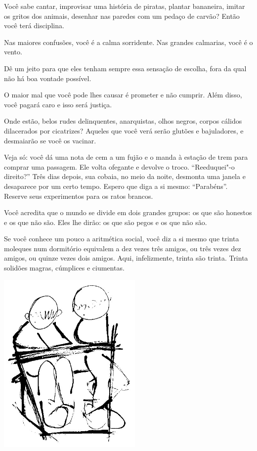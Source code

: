 Você sabe cantar, improvisar uma história de piratas, plantar bananeira,
imitar os gritos dos animais, desenhar nas paredes com um pedaço de
carvão? Então você terá disciplina.

\bigskip
\bigskip

Nas maiores confusões, você é a calma sorridente. Nas grandes calmarias,
você é o vento.

\bigskip
\bigskip

Dê um jeito para que eles tenham sempre essa sensação de escolha, fora
da qual não há boa vontade possível.

\bigskip
\bigskip

O maior mal que você pode lhes causar é prometer e não cumprir. Além
disso, você pagará caro e isso será justiça.

\bigskip
\bigskip

Onde estão, belos rudes delinquentes, anarquistas, olhos negros, corpos
cálidos dilacerados por cicatrizes? Aqueles que você verá serão glutões
e bajuladores, e desmaiarão se você os vacinar.

\bigskip
\bigskip

Veja só: você dá uma nota de cem a um fujão e o manda à estação de trem
para comprar uma passagem. Ele volta ofegante e devolve o troco.
``Reeduquei"-o direito?'' Três dias depois, sua cobaia, no meio da noite,
desmonta uma janela e desaparece por um certo tempo. Espero que diga a
si mesmo: ``Parabéns''. Reserve seus experimentos para os ratos brancos.

\bigskip
\bigskip

Você acredita que o mundo se divide em dois grandes grupos: os que são
honestos e os que não são. Eles lhe dirão: os que são pegos e os que não
são.

\bigskip
\bigskip

Se você conhece um pouco a aritmética social, você diz a si mesmo que
trinta moleques num dormitório equivalem a dez vezes três amigos, ou
três vezes dez amigos, ou quinze vezes dois amigos. Aqui, infelizmente,
trinta são trinta. Trinta solidões magras, cúmplices e ciumentas.

\bigskip
\bigskip

\begin{center}
\includegraphics[width=70mm]{./imgs/Image_5.jpg}
\end{center}

